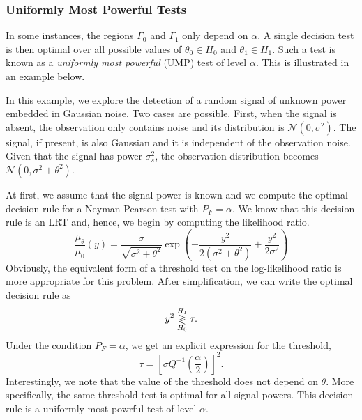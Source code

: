 \subsubsection{Uniformly Most Powerful Tests}

In some instances, the regions $\Gamma_0$ and $\Gamma_1$ only depend on $\alpha$.
A single decision test is then optimal over all possible values of $\theta_0 \in H_0$ and $\theta_1 \in H_1$.
Such a test is known as a \emph{uniformly most powerful} (UMP) test of level $\alpha$.
This is illustrated in an example below.

\begin{example}
In this example, we explore the detection of a random signal of unknown power embedded in Gaussian noise.
Two cases are possible.
First, when the signal is absent, the observation only contains noise and its distribution is $\mathcal{N}(0,\sigma^2)$.
The signal, if present, is also Gaussian and it is independent of the observation noise.
Given that the signal has power $\sigma_s^2$, the observation distribution becomes $\mathcal{N}(0,\sigma^2 + \theta^2)$.

At first, we assume that the signal power is known and we compute the optimal decision rule for a Neyman-Pearson test with $P_F = \alpha$.
We know that this decision rule is an LRT and, hence, we begin by computing the likelihood ratio.
\begin{equation*}
\frac{ \mu_{\theta} }{ \mu_0 } (y) = \frac{\sigma}{\sqrt{\sigma^2 + \theta^2}} \exp
\left( - \frac{y^2}{2 (\sigma^2 + \theta^2)} + \frac{y^2}{2 \sigma^2} \right)
\end{equation*}
Obviously, the equivalent form of a threshold test on the log-likelihood ratio is more appropriate for this problem.
After simplification, we can write the optimal decision rule as
\begin{equation*}
y^2 \overset{H_1}{ \underset{H_0}{\gtrless} } \tau .
\end{equation*}
Under the condition $P_F = \alpha$, we get an explicit expression for the threshold,
\begin{equation*}
\tau = \left[ \sigma Q^{-1} \left( \frac{\alpha}{2} \right) \right]^2 .
\end{equation*}
Interestingly, we note that the value of the threshold does not depend on $\theta$.
More specifically, the same threshold test is optimal for all signal powers.
This decision rule is a uniformly most powrful test of level $\alpha$.
\end{example}

